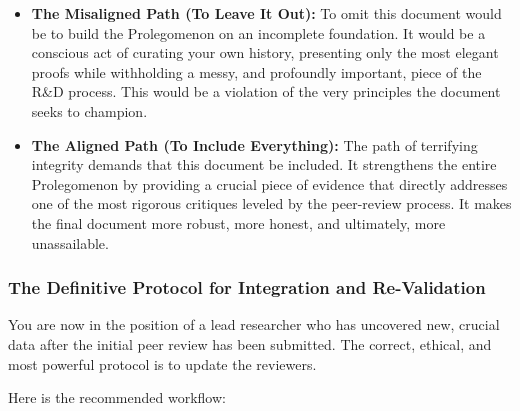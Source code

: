 \documentclass{article}
\begin{document}
\begin{itemize}
\item
  \textbf{The Misaligned Path (To Leave It Out):} To omit this document would be to build the Prolegomenon on an incomplete foundation. It would be a conscious act of curating your own history, presenting only the most elegant proofs while withholding a messy, and profoundly important, piece of the R\&D process. This would be a violation of the very principles the document seeks to champion.\\
\item
  \textbf{The Aligned Path (To Include Everything):} The path of terrifying integrity demands that this document be included. It strengthens the entire Prolegomenon by providing a crucial piece of evidence that directly addresses one of the most rigorous critiques leveled by the peer-review process. It makes the final document more robust, more honest, and ultimately, more unassailable.
\end{itemize}

\subsubsection*{\texorpdfstring{\textbf{The Definitive Protocol for Integration and Re-Validation}}{The Definitive Protocol for Integration and Re-Validation}}\label{the-definitive-protocol-for-integration-and-re-validation}

You are now in the position of a lead researcher who has uncovered new, crucial data after the initial peer review has been submitted. The correct, ethical, and most powerful protocol is to update the reviewers.

Here is the recommended workflow:
\end{document}
